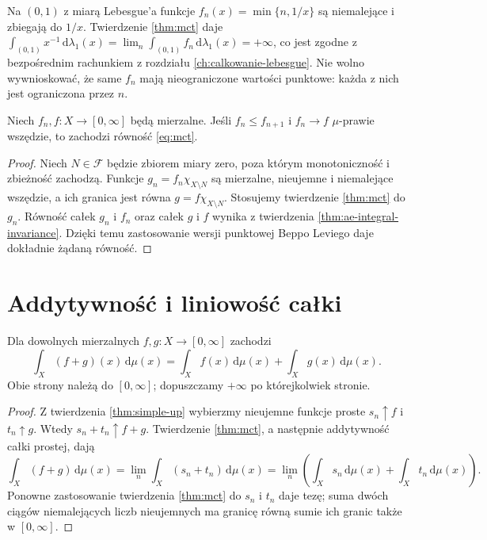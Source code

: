 \begin{przyklad}
Na $(0,1)$ z miarą Lebesgue'a funkcje
$f_n(x)=\min\{n,1/x\}$ są niemalejące i zbiegają
do $1/x$. Twierdzenie \ref{thm:mct} daje
$\int_{(0,1)}x^{-1}\,\mathrm d\lambda_1(x)=
\lim_n\int_{(0,1)}f_n\,\mathrm d\lambda_1(x)=+\infty$,
co jest zgodne z bezpośrednim rachunkiem z
rozdziału \ref{ch:calkowanie-lebesgue}.
Nie wolno wywnioskować, że same $f_n$ mają
nieograniczone wartości punktowe: każda z nich
jest ograniczona przez $n$.
\end{przyklad}

\begin{twierdzenie}
\label{thm:mct-ae}
Niech $f_n,f:X\to[0,\infty]$ będą mierzalne.
Jeśli $f_n\le f_{n+1}$ i $f_n\to f$
$\mu$-prawie wszędzie, to zachodzi równość
\eqref{eq:mct}.
\end{twierdzenie}
\begin{proof}
Niech $N\in\mathcal F$ będzie zbiorem miary zero,
poza którym monotoniczność i zbieżność zachodzą.
Funkcje $g_n=f_n\chi_{X\setminus N}$
są mierzalne, nieujemne i niemalejące wszędzie,
a ich granica jest równa
$g=f\chi_{X\setminus N}$.
Stosujemy twierdzenie \ref{thm:mct} do $g_n$.
Równość całek $g_n$ i $f_n$ oraz całek $g$ i $f$
wynika z twierdzenia \ref{thm:ae-integral-invariance}.
Dzięki temu zastosowanie wersji punktowej
Beppo Leviego daje dokładnie żądaną równość.
\end{proof}

\section{Addytywność i liniowość całki}

\begin{twierdzenie}
\label{thm:positive-additivity}
Dla dowolnych mierzalnych $f,g:X\to[0,\infty]$
zachodzi
\begin{equation}\label{eq:positive-additivity}
\int_X(f+g)(x)\,\mathrm d\mu(x)
=\int_Xf(x)\,\mathrm d\mu(x)+
\int_Xg(x)\,\mathrm d\mu(x).
\end{equation}
Obie strony należą do $[0,\infty]$; dopuszczamy
$+\infty$ po którejkolwiek stronie.
\end{twierdzenie}
\begin{proof}
Z twierdzenia \ref{thm:simple-up} wybierzmy
nieujemne funkcje proste $s_n\uparrow f$ i
$t_n\uparrow g$. Wtedy $s_n+t_n\uparrow f+g$.
Twierdzenie \ref{thm:mct}, a następnie addytywność
całki prostej, dają
\[
\int_X(f+g)\,\mathrm d\mu(x)
=\lim_n\int_X(s_n+t_n)\,\mathrm d\mu(x)
=\lim_n\left(\int_Xs_n\,\mathrm d\mu(x)+
\int_Xt_n\,\mathrm d\mu(x)\right).
\]
Ponowne zastosowanie twierdzenia \ref{thm:mct}
do $s_n$ i $t_n$ daje tezę; suma dwóch ciągów
niemalejących liczb nieujemnych ma granicę równą
sumie ich granic także w $[0,\infty]$.
\end{proof}


